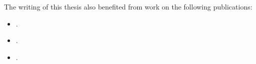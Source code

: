 
\noindent%
The writing of this thesis also benefited from work on the following publications:

\begin{itemize}
\item {}.
\item {}.
\item {}.
\end{itemize}
